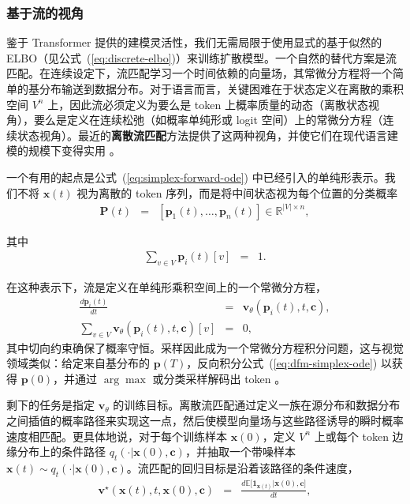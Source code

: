\documentclass[UTF8,a4paper,zihao=-4,oneside,openany]{ctexbook}
\begin{document}
\subsubsection{基于流的视角}

鉴于 Transformer 提供的建模灵活性，我们无需局限于使用显式的基于似然的 ELBO（见公式~(\ref{eq:discrete-elbo})）来训练扩散模型。一个自然的替代方案是流匹配。在连续设定下，流匹配学习一个时间依赖的向量场，其常微分方程将一个简单的基分布输送到数据分布。对于语言而言，关键困难在于状态定义在离散的乘积空间 $V^n$ 上，因此流必须定义为要么是 token 上概率质量的动态（离散状态视角），要么是定义在连续松弛（如概率单纯形或 logit 空间）上的常微分方程（连续状态视角）。最近的\textbf{离散流匹配}方法提供了这两种视角，并使它们在现代语言建模的规模下变得实用 \citep{gat-etal:2024discrete,campbell-etal:2024generative,shaul-etal:2025flow}。

一个有用的起点是公式~(\ref{eq:simplex-forward-ode}) 中已经引入的单纯形表示。我们不将 $\mathbf{x}(t)$ 视为离散的 token 序列，而是将中间状态视为每个位置的分类概率
\begin{eqnarray}
\mathbf{P}(t) & = & [\mathbf{p}_1(t), \dots, \mathbf{p}_n(t)]
\in \mathbb{R}^{|V|\times n},
\end{eqnarray}

\noindent 其中
\begin{eqnarray}
\sum_{v\in V} \mathbf{p}_i(t)[v] & = &  1.
\end{eqnarray}

在这种表示下，流是定义在单纯形乘积空间上的一个常微分方程，
\begin{eqnarray}
\frac{d\mathbf{p}_i(t)}{dt} & = & \mathbf{v}_{\theta}(\mathbf{p}_i(t),t,\mathbf{c}), \\
\sum_{v\in V}\mathbf{v}_{\theta}(\mathbf{p}_i(t),t,\mathbf{c})[v] & = & 0,
\label{eq:dfm-simplex-ode}
\end{eqnarray}
其中切向约束确保了概率守恒。采样因此成为一个常微分方程积分问题，这与视觉领域类似：给定来自基分布的 $\mathbf{p}(T)$，反向积分公式~(\ref{eq:dfm-simplex-ode}) 以获得 $\mathbf{p}(0)$，并通过 $\arg\max$ 或分类采样解码出 token 。

剩下的任务是指定 $\mathbf{v}_\theta$ 的训练目标。离散流匹配通过定义一族在源分布和数据分布之间插值的概率路径来实现这一点，然后使模型向量场与这些路径诱导的瞬时概率速度相匹配。更具体地说，对于每个训练样本 $\mathbf{x}(0)$，定义 $V^n$ 上或每个 token 边缘分布上的条件路径 $q_t(\cdot | \mathbf{x}(0), \mathbf{c})$，并抽取一个带噪样本 $\mathbf{x}(t)\sim q_t(\cdot | \mathbf{x}(0), \mathbf{c})$。流匹配的回归目标是沿着该路径的条件速度，
\begin{eqnarray}
\mathbf{v}^\star(\mathbf{x}(t),t,\mathbf{x}(0),\mathbf{c})
& = &
\frac{d \mathbb{E}\big[\mathbf{1}_{\mathbf{x}(t)} | \mathbf{x}(0), \mathbf{c} \big]}{dt},
\label{eq:dfm-target-velocity}
\end{eqnarray}
\end{document}
